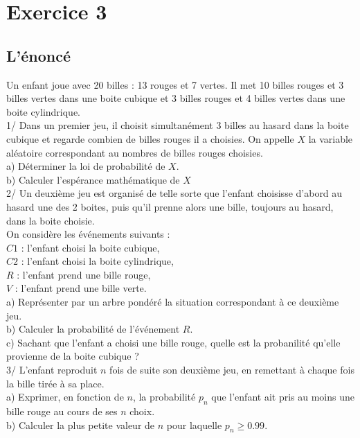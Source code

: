 \documentclass[a4paper,11pt]{book}
\begin{document}
\section{Exercice 3}
\subsection{L'\'enonc\'e}
Un enfant joue avec 20 billes : 13 rouges et 7 vertes. Il met 10 billes rouges
et 3 billes vertes dans une boite cubique et 3 billes rouges
et 4 billes vertes dans une boite cylindrique.\\
1/ Dans un premier jeu, il choisit simultan\'ement 3 billes au hasard dans la 
boite cubique et regarde combien de billes rouges il a choisies. On appelle $X$
la variable al\'eatoire correspondant au nombres de billes rouges choisies.\\
a) D\'eterminer la loi de probabilit\'e de $X$.\\ 
b) Calculer l'esp\'erance math\'ematique de $X$\\
2/ Un deuxi\`eme jeu est organis\'e  de telle sorte que l'enfant choisisse 
d'abord au hasard une des 2 boites, puis qu'il prenne alors une bille, 
toujours au hasard, dans la boite choisie.\\
On consid\`ere les \'ev\'enements suivants :\\
$C1$ : l'enfant choisi la boite cubique,\\ 
$C2$ : l'enfant choisi la boite cylindrique,\\ 
$R$ :  l'enfant prend une bille rouge,\\
$V$ :  l'enfant prend une bille verte.\\
a) Repr\'esenter par un arbre pond\'er\'e la situation correspondant \`a ce 
deuxi\`eme jeu.\\
b) Calculer la probabilit\'e de l'\'ev\'enement $R$.\\
c) Sachant que l'enfant a choisi une bille rouge, quelle est la probanilit\'e 
qu'elle provienne de la boite cubique ?\\
3/ L'enfant reproduit $n$ fois de suite son deuxi\`eme jeu, en remettant
\`a chaque fois la bille tir\'ee \`a sa place.\\
a) Exprimer, en fonction de $n$, la probabilit\'e $p_n$ que l'enfant ait pris 
au moins une bille rouge au cours de ses $n$ choix.\\
b) Calculer la plus petite valeur de $n$ pour laquelle $p_n \geq 0.99$.\\ 
\end{document}
